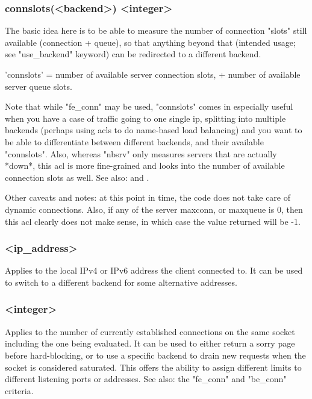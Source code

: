 \subsubsection*{connslots(<backend>) <integer>}
  The basic idea here is to be able to measure the number of connection "slots"
  still available (connection + queue), so that anything beyond that (intended
  usage; see "use\_backend" keyword) can be redirected to a different backend.

  'connslots' = number of available server connection slots, + number of
  available server queue slots.

  Note that while "fe\_conn" may be used, "connslots" comes in especially
  useful when you have a case of traffic going to one single ip, splitting into
  multiple backends (perhaps using acls to do name-based load balancing) and
  you want to be able to differentiate between different backends, and their
  available "connslots".  Also, whereas "nbsrv" only measures servers that are
  actually *down*, this acl is more fine-grained and looks into the number of
  available connection slots as well.
See also:  and .

  \begin{note}{Other caveats and notes:} at this point in time, the code does not take care
  of dynamic connections. Also, if any of the server maxconn, or maxqueue is 0,
  then this acl clearly does not make sense, in which case the value returned
  will be -1.
  \end{note}

\subsubsection[dst]{ <ip\_address>}
  Applies to the local IPv4 or IPv6 address the client connected to. It can be
  used to switch to a different backend for some alternative addresses.

\subsubsection[dst\_conn]{ <integer>}
  Applies to the number of currently established connections on the same socket
  including the one being evaluated. It can be used to either return a sorry
  page before hard-blocking, or to use a specific backend to drain new requests
  when the socket is considered saturated. This offers the ability to assign
  different limits to different listening ports or addresses.
See also: the
  "fe\_conn" and "be\_conn" criteria.

